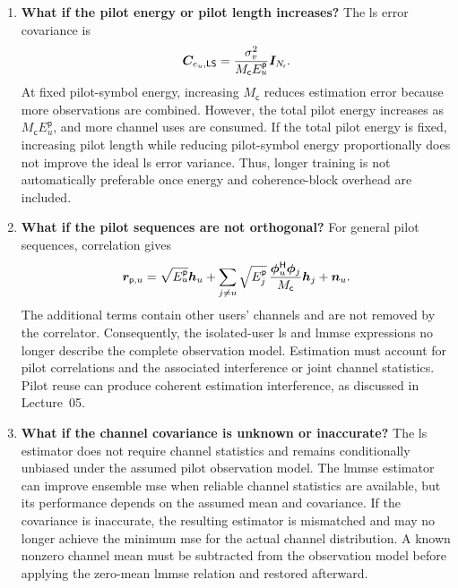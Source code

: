 \begin{enumerate}[label=\textbf{\arabic*.}]
	\item \textbf{What if the pilot energy or pilot length increases?}
	The \ac{ls} error covariance is
	\begin{equation*}
		\bm{C}_{e_u,\mathsf{LS}}
		=\frac{\sigma_v^2}{M_{\mathsf c}E_u^{\mathsf p}}\bm{I}_{N_{\mathsf{r}}}.
	\end{equation*}
	At fixed pilot-symbol energy, increasing $M_{\mathsf c}$ reduces estimation error because more observations are combined. However, the total pilot energy increases as $M_{\mathsf c}E_u^{\mathsf p}$, and more channel uses are consumed. If the total pilot energy is fixed, increasing pilot length while reducing pilot-symbol energy proportionally does not improve the ideal \ac{ls} error variance. Thus, longer training is not automatically preferable once energy and coherence-block overhead are included.
	
	\item \textbf{What if the pilot sequences are not orthogonal?}
	For general pilot sequences, correlation gives
	\begin{equation*}
		\bm{r}_{\mathsf p,u}
		=\sqrt{E_u^{\mathsf p}}\bm{h}_u
		+\sum_{j\ne u}
		\sqrt{E_j^{\mathsf p}}\,
		\frac{{\bm{\phi}}^{\mathsf{H}}_u\bm{\phi}_j}{M_{\mathsf c}}\bm{h}_j
		+\bm{n}_u.
	\end{equation*}
	The additional terms contain other users' channels and are not removed by the correlator. Consequently, the isolated-user \ac{ls} and \ac{lmmse} expressions no longer describe the complete observation model. Estimation must account for pilot correlations and the associated interference or joint channel statistics. Pilot reuse can produce coherent estimation interference, as discussed in Lecture~05.
	
	\item \textbf{What if the channel covariance is unknown or inaccurate?}
	The \ac{ls} estimator does not require channel statistics and remains conditionally unbiased under the assumed pilot observation model. The \ac{lmmse} estimator can improve ensemble \ac{mse} when reliable channel statistics are available, but its performance depends on the assumed mean and covariance. If the covariance is inaccurate, the resulting estimator is mismatched and may no longer achieve the minimum \ac{mse} for the actual channel distribution. A known nonzero channel mean must be subtracted from the observation model before applying the zero-mean \ac{lmmse} relation and restored afterward.
	

\end{enumerate}
